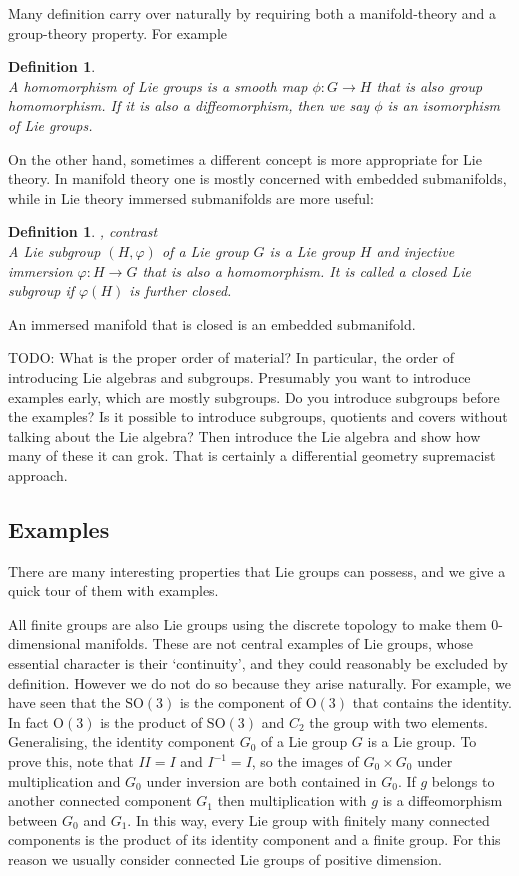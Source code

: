 \documentclass[twoside,11pt,a4paper,leqno]{article}
\numberwithin{equation}{section}
\theoremstyle{plain}
\newtheorem{definition}[equation]{Definition}
\theoremstyle{definition}
\renewcommand{\O}{\mathrm{O}}
\newcommand{\SO}{\mathrm{SO}}
\begin{document}
Many definition carry over naturally by requiring both a manifold-theory and a group-theory property.
For example
\begin{definition}
\textup{\cite[3.13]{Warner1983}} \\
A \emph{homomorphism of Lie groups} is a smooth map $\phi : G \to H$ that is also group homomorphism.
If it is also a diffeomorphism, then we say $\phi$ is an \emph{isomorphism of Lie groups}.
\end{definition}
On the other hand, sometimes a different concept is more appropriate for Lie theory.
In manifold theory one is mostly concerned with embedded submanifolds, while in Lie theory immersed submanifolds are more useful:
\begin{definition}
\textup{\cite[3.17]{Warner1983}, contrast~\cite[\S{}7.1]{Fulton2004}}\\
A \emph{Lie subgroup} $(H,\varphi)$ of a Lie group $G$ is a Lie group $H$ and injective immersion $\varphi : H \to G$ that is also a homomorphism.
It is called a \emph{closed Lie subgroup} if $\varphi(H)$ is further closed.
\end{definition}
An immersed manifold that is closed is an embedded submanifold. 

TODO: What is the proper order of material? 
In particular, the order of introducing Lie algebras and subgroups. 
Presumably you want to introduce examples early, which are mostly subgroups. 
Do you introduce subgroups before the examples?
Is it possible to introduce subgroups, quotients and covers without talking about the Lie algebra? Then introduce the Lie algebra and show how many of these it can grok.
That is certainly a differential geometry supremacist approach.


\subsection{Examples}

There are many interesting properties that Lie groups can possess, and we give a quick tour of them with examples.

All finite groups are also Lie groups using the discrete topology to make them $0$-dimensional manifolds.
These are not central examples of Lie groups, whose essential character is their `continuity', and they could reasonably be excluded by definition.
However we do not do so because they arise naturally.
For example, we have seen that the $\SO(3)$ is the component of $\O(3)$ that contains the identity.
In fact $\O(3)$ is the product of $\SO(3)$ and $C_2$ the group with two elements.
Generalising, the identity component $G_0$ of a Lie group $G$ is a Lie group.
To prove this, note that $II = I$ and $I^{-1} = I$, so the images of $G_0\times G_0$ under multiplication and $G_0$ under inversion are both contained in $G_0$.
If $g$ belongs to another connected component $G_1$ then multiplication with $g$ is a diffeomorphism between $G_0$ and $G_1$.
In this way, every Lie group with finitely many connected components is the product of its identity component and a finite group.
For this reason we usually consider connected Lie groups of positive dimension.
\end{document}
